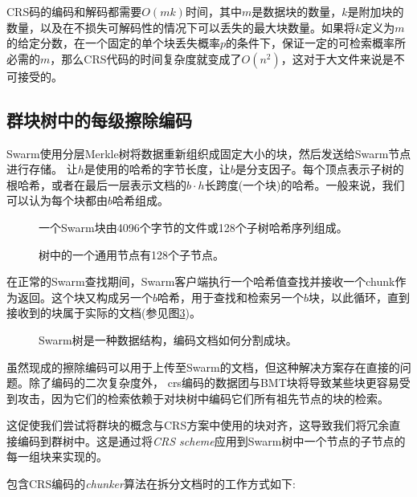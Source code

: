 CRS码的编码和解码都需要$O(mk)$时间，其中$m$是数据块的数量，$k$是附加块的数量，以及在不损失可解码性的情况下可以丢失的最大块数量。如果将$k$定义为$m$的给定分数，在一个固定的单个块丢失概率$p$的条件下，保证一定的可检索概率所必需的$m$，那么CRS代码的时间复杂度就变成了$O(n^2)$，这对于大文件来说是不可接受的。 

\subsection{群块树中的每级擦除编码\statusgreen}

Swarm使用分层Merkle树\cite{merkle1980protocols}将数据重新组织成固定大小的块，然后发送给Swarm节点进行存储。
让$h$是使用的哈希的字节长度，让$b$是分支因子。每个顶点表示子树的根哈希，或者在最后一层表示文档的$b\cdot h$长跨度(一个块)的哈希。一般来说，我们可以认为每个块都由$b$哈希组成。


\begin{figure}[htbp]
   \centering
   
   \caption[群块\statusgreen]{一个Swarm块由4096个字节的文件或128个子树哈希序列组成。}
   \label{fig:chunk}
\end{figure}


\begin{figure}[htbp]
   \centering
   
   \caption[树中的一个通用节点有128个子\statusgreen]{树中的一个通用节点有128个子节点。}
   \label{fig:Swarm-hash-basic}
\end{figure}

在正常的Swarm查找期间，Swarm客户端执行一个哈希值查找并接收一个chunk作为返回。这个块又构成另一个$b$哈希，用于查找和检索另一个$b$块，以此循环，直到接收到的块属于实际的文档(参见图\ref{fig:Swarm-hash-split})。


\begin{figure}[htbp]
   \centering
   
   \caption[Swarm哈希分裂\statusgreen]{Swarm树是一种数据结构，编码文档如何分割成块。}
   \label{fig:Swarm-hash-split}
\end{figure}

虽然现成的擦除编码可以用于上传至Swarm的文档，但这种解决方案存在直接的问题。除了编码的二次复杂度外， crs编码的数据团与BMT块将导致某些块更容易受到攻击，因为它们的检索依赖于对块树中编码它们所有祖先节点的块的检索。

这促使我们尝试将群块的概念与CRS方案中使用的块对齐，这导致我们将冗余直接编码到群树中。这是通过将\emph{CRS scheme}应用到Swarm树中一个节点的子节点的每一组块来实现的。

包含CRS编码的\emph{chunker}算法在拆分文档时的工作方式如下:

